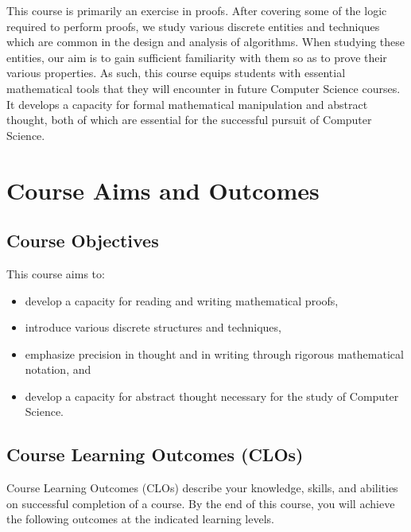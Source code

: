 \documentclass[a4paper]{article}
\begin{document}
This course is primarily an exercise in proofs. After covering some of the logic required to perform proofs, we study various discrete entities and techniques which are common in the design and analysis of algorithms.  When studying these entities, our aim is to gain sufficient familiarity with them so as to prove their various properties. As such, this course equips students with essential mathematical tools that they will encounter in future Computer Science courses.  It develops a capacity for formal mathematical manipulation and abstract thought, both of which are essential for the successful pursuit of Computer Science.

\section{Course Aims and Outcomes}

\subsection{Course Objectives}

This course aims to:
\begin{itemize}
\item develop a capacity for reading and writing mathematical proofs,
\item introduce various discrete structures and techniques,
\item emphasize precision in thought and in writing through rigorous mathematical notation, and
\item develop a capacity for abstract thought necessary for the study of Computer Science.
\end{itemize}

\subsection{Course Learning Outcomes (CLOs)}

Course Learning Outcomes (CLOs) describe your knowledge, skills, and abilities on successful completion of a course. By the end of this course, you will achieve the following outcomes at the indicated learning levels.
\end{document}
